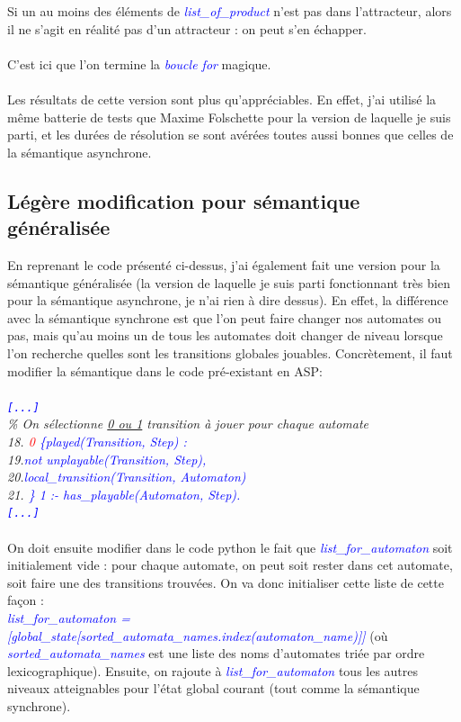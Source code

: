 \documentclass[10pt,a4paper]{article}
\begin{document}
Si un au moins des éléments de \emph{\textcolor{blue}{list\_of\_product}} n'est pas dans l'attracteur, alors il ne s'agit en réalité pas d'un attracteur : on peut s'en échapper.\\ \\
C'est ici que l'on termine la \emph{\textcolor{blue}{boucle for}} magique.\\ \\
Les résultats de cette version sont plus qu'appréciables. En effet, j'ai utilisé la même batterie de tests que Maxime Folschette pour la version de laquelle je suis parti, et les durées de résolution se sont avérées toutes aussi 
bonnes que celles de la sémantique asynchrone.

\subsection{Légère modification pour sémantique généralisée}
En reprenant le code présenté ci-dessus, j'ai également fait une version pour la sémantique généralisée (la version de laquelle je suis parti fonctionnant très bien pour la sémantique asynchrone, je n'ai rien à dire 
dessus). En effet, la différence avec la sémantique synchrone est que l'on peut faire changer nos automates ou pas, mais qu'au moins un de tous les automates doit changer de niveau lorsque l'on recherche quelles sont les 
transitions globales jouables.
Concrètement, il faut modifier la sémantique dans le code pré-existant en ASP:\\ \\
\emph{
	\textcolor{blue}{\verb![...]!}\\
	\% On sélectionne \underline{0 ou 1} transition à jouer pour chaque automate\\
	18. \textcolor{blue}{\textcolor{red}{0} \{played(Transition, Step) :}\\
	19.\qquad\qquad\textcolor{blue}{not unplayable(Transition, Step),}\\
	20.\qquad\qquad\textcolor{blue}{local\_transition(Transition, Automaton)}\\
	21. \textcolor{blue}{\} 1 :- has\_playable(Automaton, Step).}\\
	\textcolor{blue}{\verb![...]!}\\ \\
}
On doit ensuite modifier dans le code python le fait que \emph{\textcolor{blue}{list\_for\_automaton}} soit initialement vide : pour chaque automate, on peut soit rester dans cet automate, soit faire une des transitions trouvées. 
On va donc initialiser cette liste de cette façon :\\
\emph{\textcolor{blue}{list\_for\_automaton = [global\_state[sorted\_automata\_names.index(automaton\_name)]]}} (où \\
\emph{\textcolor{blue}{sorted\_automata\_names}} est une liste des noms d'automates triée par ordre lexicographique). Ensuite, on rajoute à \emph{\textcolor{blue}{list\_for\_automaton}} tous les autres niveaux atteignables pour 
l'état global courant (tout comme la sémantique synchrone).
\end{document}
